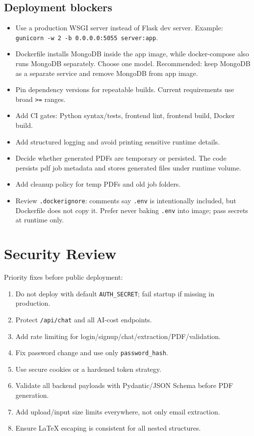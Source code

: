 \documentclass[11pt]{article}
\begin{document}
\subsection{Deployment blockers}
\begin{itemize}
  \item Use a production WSGI server instead of Flask dev server. Example: \texttt{gunicorn -w 2 -b 0.0.0.0:5055 server:app}.
  \item Dockerfile installs MongoDB inside the app image, while docker-compose also runs MongoDB separately. Choose one model. Recommended: keep MongoDB as a separate service and remove MongoDB from app image.
  \item Pin dependency versions for repeatable builds. Current requirements use broad \texttt{>=} ranges.
  \item Add CI gates: Python syntax/tests, frontend lint, frontend build, Docker build.
  \item Add structured logging and avoid printing sensitive runtime details.
  \item Decide whether generated PDFs are temporary or persisted. The code persists pdf job metadata and stores generated files under runtime volume.
  \item Add cleanup policy for temp PDFs and old job folders.
  \item Review \texttt{.dockerignore}: comments say \texttt{.env} is intentionally included, but Dockerfile does not copy it. Prefer never baking \texttt{.env} into image; pass secrets at runtime only.
\end{itemize}

\section{Security Review}

Priority fixes before public deployment:
\begin{enumerate}
  \item Do not deploy with default \texttt{AUTH\_SECRET}; fail startup if missing in production.
  \item Protect \texttt{/api/chat} and all AI-cost endpoints.
  \item Add rate limiting for login/signup/chat/extraction/PDF/validation.
  \item Fix password change and use only \texttt{password\_hash}.
  \item Use secure cookies or a hardened token strategy.
  \item Validate all backend payloads with Pydantic/JSON Schema before PDF generation.
  \item Add upload/input size limits everywhere, not only email extraction.
  \item Ensure LaTeX escaping is consistent for all nested structures.
\end{enumerate}
\end{document}
